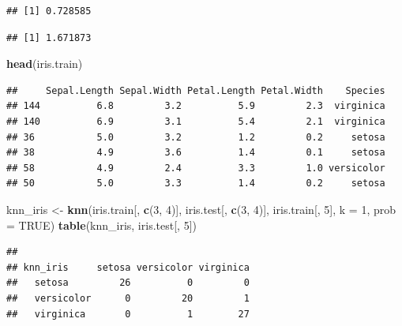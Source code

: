 \documentclass[]{article}
\newenvironment{Shaded}{\begin{snugshade}}{\end{snugshade}}
\newcommand{\KeywordTok}[1]{\textcolor[rgb]{0.13,0.29,0.53}{\textbf{#1}}}
\newcommand{\DataTypeTok}[1]{\textcolor[rgb]{0.13,0.29,0.53}{#1}}
\newcommand{\DecValTok}[1]{\textcolor[rgb]{0.00,0.00,0.81}{#1}}
\newcommand{\StringTok}[1]{\textcolor[rgb]{0.31,0.60,0.02}{#1}}
\newcommand{\OtherTok}[1]{\textcolor[rgb]{0.56,0.35,0.01}{#1}}
\newcommand{\OperatorTok}[1]{\textcolor[rgb]{0.81,0.36,0.00}{\textbf{#1}}}
\newcommand{\NormalTok}[1]{#1}
\begin{document}
\begin{verbatim}
## [1] 0.728585
\end{verbatim}

\begin{Shaded}
\end{Shaded}

\begin{verbatim}
## [1] 1.671873
\end{verbatim}

\begin{Shaded}
\begin{Highlighting}[]
\KeywordTok{head}\NormalTok{(iris.train)}
\end{Highlighting}
\end{Shaded}

\begin{verbatim}
##     Sepal.Length Sepal.Width Petal.Length Petal.Width    Species
## 144          6.8         3.2          5.9         2.3  virginica
## 140          6.9         3.1          5.4         2.1  virginica
## 36           5.0         3.2          1.2         0.2     setosa
## 38           4.9         3.6          1.4         0.1     setosa
## 58           4.9         2.4          3.3         1.0 versicolor
## 50           5.0         3.3          1.4         0.2     setosa
\end{verbatim}

\begin{Shaded}
\begin{Highlighting}[]
\NormalTok{knn_iris <-}\StringTok{ }\KeywordTok{knn}\NormalTok{(iris.train[, }\KeywordTok{c}\NormalTok{(}\DecValTok{3}\NormalTok{, }\DecValTok{4}\NormalTok{)], iris.test[, }\KeywordTok{c}\NormalTok{(}\DecValTok{3}\NormalTok{, }\DecValTok{4}\NormalTok{)], iris.train[, }\DecValTok{5}\NormalTok{], }\DataTypeTok{k =} \DecValTok{1}\NormalTok{, }\DataTypeTok{prob =} \OtherTok{TRUE}\NormalTok{)}
\KeywordTok{table}\NormalTok{(knn_iris, iris.test[, }\DecValTok{5}\NormalTok{])}
\end{Highlighting}
\end{Shaded}

\begin{verbatim}
##             
## knn_iris     setosa versicolor virginica
##   setosa         26          0         0
##   versicolor      0         20         1
##   virginica       0          1        27
\end{verbatim}
\end{document}
